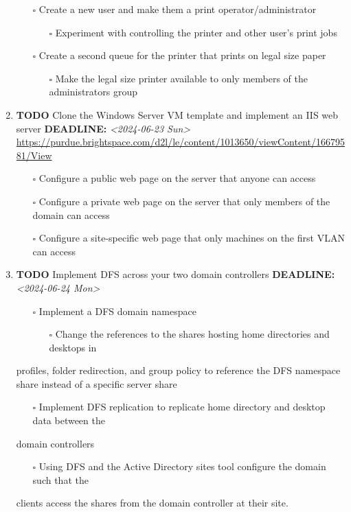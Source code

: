 \documentclass[letterpaper]{article}
\begin{document}
\begin{enumerate}
\begin{itemize}
\item[{$\square$}] Create a new user and make them a print operator/administrator
\begin{itemize}
\item[{$\square$}] Experiment with controlling the printer and other user’s print jobs
\end{itemize}
\item[{$\square$}] Create a second queue for the printer that prints on legal size paper
\begin{itemize}
\item[{$\square$}] Make the legal size printer available to only members of the administrators group
\end{itemize}
\end{itemize}
\item {\bfseries\sffamily TODO} Clone the Windows Server VM template and implement an IIS web server
\label{sec:org068c6ce}
\noindent\textbf{DEADLINE:} \textit{<2024-06-23 Sun>}\\[0pt]
\url{https://purdue.brightspace.com/d2l/le/content/1013650/viewContent/16679581/View}
\begin{itemize}
\item[{$\square$}] Configure a public web page on the server that anyone can access
\item[{$\square$}] Configure a private web page on the server that only members of the domain can access
\item[{$\square$}] Configure a site-specific web page that only machines on the first VLAN can access
\end{itemize}
\item {\bfseries\sffamily TODO} Implement DFS across your two domain controllers
\label{sec:orgcf3d549}
\noindent\textbf{DEADLINE:} \textit{<2024-06-24 Mon>}\\[0pt]
\begin{itemize}
\item[{$\square$}] Implement a DFS domain namespace
\begin{itemize}
\item[{$\square$}] Change the references to the shares hosting home directories and desktops in
\end{itemize}
\end{itemize}
profiles, folder redirection, and group policy to reference the DFS namespace
share instead of a specific server share
\begin{itemize}
\item[{$\square$}] Implement DFS replication to replicate home directory and desktop data between the
\end{itemize}
domain controllers
\begin{itemize}
\item[{$\square$}] Using DFS and the Active Directory sites tool configure the domain such that the
\end{itemize}
clients access the shares from the domain controller at their site.
\end{enumerate}
\end{document}
